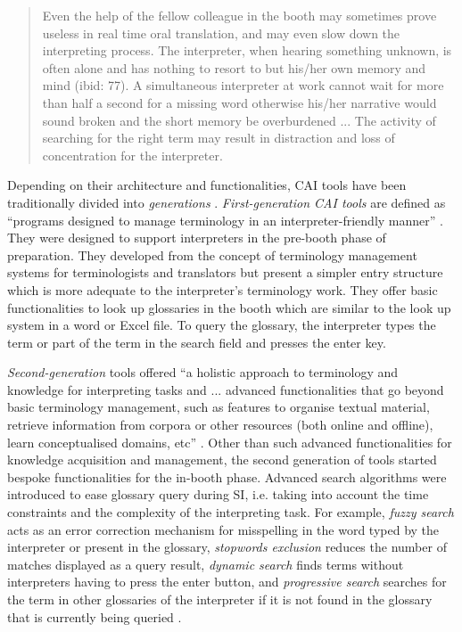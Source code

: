 \begin{quote}
    Even the help of the fellow colleague in the booth may sometimes prove useless in real time oral translation, and may even slow down the interpreting process. The interpreter, when hearing something unknown, is often alone and has nothing to resort to but his/her own memory and mind (ibid: 77). A simultaneous interpreter at work cannot wait for more than half a second for a missing word otherwise his/her narrative would sound broken and the short memory be overburdened ... The activity of searching for the right term may result in distraction and loss of concentration for the interpreter. \citep[91]{tripepi2010usefulness}
\end{quote}
Depending on their architecture and functionalities, CAI tools have been traditionally divided into \textit{generations} \citep{eabm2021a,fantinuoli2018b,prandi2022a,prandi2023}. \textit{First-generation CAI tools} are defined as ``programs designed to manage terminology in an interpreter-friendly manner'' \citep[164]{fantinuoli2018b}. They were designed to support interpreters in the pre-booth phase of preparation. They developed from the concept of terminology management systems for terminologists and translators but present a simpler entry structure which is more adequate to the interpreter’s terminology work. They offer basic functionalities to look up glossaries in the booth which are similar to the look up system in a word or Excel file. To query the glossary, the interpreter types the term or part of the term in the search field and presses the enter key.

\textit{Second-generation} tools offered ``a holistic approach to terminology and knowledge for interpreting tasks and ... advanced functionalities that go beyond basic terminology management, such as features to organise textual material, retrieve information from corpora or other resources (both online and offline), learn conceptualised domains, etc'' \citep[165]{fantinuoli2018b}. Other than such advanced functionalities for knowledge acquisition and management, the second generation of tools started bespoke functionalities for the in-booth phase. Advanced search algorithms were introduced to ease glossary query during SI, i.e. taking into account the time constraints and the complexity of the interpreting task. For example, \textit{fuzzy search} acts as an error correction mechanism for misspelling in the word typed by the interpreter or present in the glossary, \textit{stopwords exclusion} reduces the number of matches displayed as a query result, \textit{dynamic search} finds terms without interpreters having to press the enter button, and \textit{progressive search} searches for the term in other glossaries of the interpreter if it is not found in the glossary that is currently being queried \citep[166]{fantinuoli2018b}.

